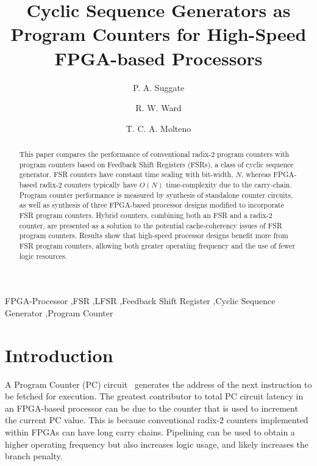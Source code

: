 \documentclass[5p, twocolumn]{elsarticle}
\begin{document}
\begin{frontmatter}
\title{Cyclic Sequence Generators as Program Counters for High-Speed FPGA-based
Processors}
\author{P. A. Suggate}
\author{R. W. Ward}
\author{T. C. A. Molteno}
\address{Department of Physics, University of Otago, P.O. Box 56, Dunedin, New Zealand}

\begin{abstract}

This paper compares the performance of conventional radix-2 program counters with
program counters based on Feedback Shift Registers (FSRs), a class of cyclic
sequence generator. FSR counters have constant time scaling with bit-width, $N$,
whereas FPGA-based radix-2 counters typically have $O(N)$ time-complexity due to
the carry-chain. Program counter performance is measured by synthesis of
standalone counter circuits, as well as synthesis of three FPGA-based processor
designs modified to incorporate FSR program counters. Hybrid counters, combining
both an FSR and a radix-2 counter, are presented as a solution to the potential
cache-coherency issues of FSR program counters. Results show that high-speed
processor designs benefit more from FSR program counters, allowing both greater
operating frequency and the use of fewer logic resources.


\end{abstract}

\begin{keyword}
FPGA-Processor \sep FSR \sep LFSR \sep Feedback Shift Register \sep Cyclic
 Sequence Generator \sep Program Counter
\end{keyword}

\end{frontmatter}

\tableofcontents

\section{Introduction}

A Program Counter (PC) circuit~\cite{parhami2005cam} generates the address of the
next instruction to be fetched for execution. The greatest contributor to total
PC circuit latency in an FPGA-based processor can be due to the counter that is
used to increment the current PC value. This is because conventional radix-2
counters implemented within FPGAs can have long carry chains. Pipelining can be
used to obtain a higher operating frequency but also increases logic usage,
and likely increases the branch penalty.
\end{document}
